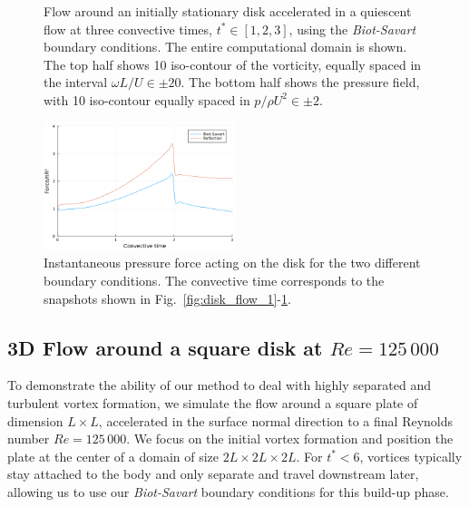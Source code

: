 \documentclass[preprint,12pt]{elsarticle}
\begin{document}
\begin{figure}
\begin{subfigure}{.33\textwidth}
    \end{subfigure}
    \caption{Flow around an initially stationary disk accelerated in a quiescent flow at three convective times, $t^*\in [1,2,3]$, using the \emph{Biot-Savart} boundary conditions. The entire computational domain is shown. The top half shows 10 iso-contour of the vorticity, equally spaced in the interval $\omega L/U\in\pm20$. The bottom half shows the pressure field, with 10 iso-contour equally spaced in $p/\rho U^2\in\pm2$.}
    \label{fig:disk_flow_2}
\end{figure}


\begin{figure}
    \centering
    \includegraphics[width=0.5\textwidth]{tex//fig/Disk_256D_force.png}
    \caption{Instantaneous pressure force acting on the disk for the two different boundary conditions. The convective time corresponds to the snapshots shown in Fig.~\ref{fig:disk_flow_1}-\ref{fig:disk_flow_2}.}
    \label{fig:disk_forces}
\end{figure}


\subsection{3D Flow around a square disk at $Re=125\,000$}

To demonstrate the ability of our method to deal with highly separated and turbulent vortex formation, we simulate the flow around a square plate of dimension $L\times L$, accelerated in the surface normal direction to a final Reynolds number $Re=125\,000$. We focus on the initial vortex formation and position the plate at the center of a domain of size $2L\times2L\times2L$. For $t^*<6$, vortices typically stay attached to the body and only separate and travel downstream later, allowing us to use our \emph{Biot-Savart} boundary conditions for this build-up phase. 
\end{document}
